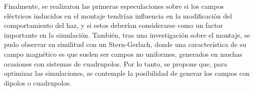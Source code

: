 Finalmente, se realizaron las primeras especulaciones sobre si los
campos eléctricos inducidos en el montaje tendrían influencia en la
modificación del comportamiento del haz, y si estos deberían considerarse como
un factor importante en la simulación. También, tras una investigación sobre el
montaje, se pudo observar su similitud con un Stern-Gerlach, donde una
característica de su campo magnético es que suelen ser campos no uniformes,
generados en muchas ocasiones con sistemas de cuadrupolos. Por lo tanto, se
propone que, para optimizar las simulaciones, se contemple la posibilidad de
generar los campos con dipolos o cuadrupolos.
